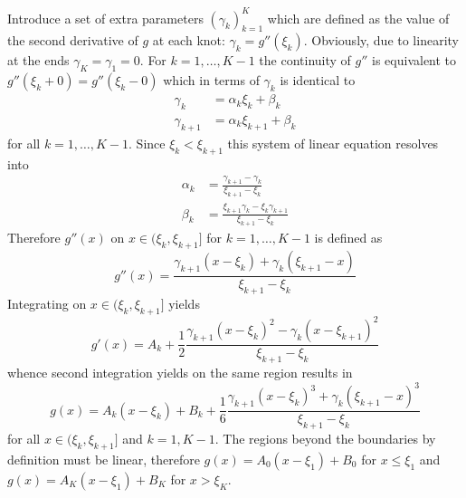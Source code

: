 \documentclass[a4paper]{article}
\begin{document}
Introduce a set of extra parameters $(\gamma_k)_{k=1}^K$ which are defined as the
value of the second derivative of $g$ at each knot: $\gamma_k=g''(\xi_k)$.
Obviously, due to linearity at the ends $\gamma_K = \gamma_1 = 0$.
For $k=1,\ldots, K-1$ the continuity of $g''$ is equivalent to $g''(\xi_k+0) = g''(\xi_k-0)$
which in terms of $\gamma_k$ is identical to
\begin{align*}
	\gamma_k &= \alpha_k \xi_k + \beta_k\\
	\gamma_{k+1} &= \alpha_k \xi_{k+1} + \beta_k
\end{align*}
for all $k=1,\ldots,K-1$. Since $\xi_k<\xi_{k+1}$ this system of linear equation
resolves into
\begin{align*}
	\alpha_k &= \frac{\gamma_{k+1}-\gamma_k}{\xi_{k+1}-\xi_k}\\
	\beta_k &= \frac{\xi_{k+1}\gamma_k - \xi_k\gamma_{k+1}}{\xi_{k+1}-\xi_k}
\end{align*}
Therefore $g''(x)$ on $x\in (\xi_k, \xi_{k+1}]$ for $k=1,\ldots, K-1$ is defined as
\[g''(x) = \frac{\gamma_{k+1}(x-\xi_k)+\gamma_k(\xi_{k+1}-x)}{\xi_{k+1}-\xi_k}\]
Integrating on $x\in (\xi_k,\xi_{k+1}]$ yields
\[g'(x) = A_k + \frac{1}{2}\frac{\gamma_{k+1}(x-\xi_k)^2-\gamma_k(x-\xi_{k+1})^2}{\xi_{k+1}-\xi_k}\]
whence second integration yields on the same region results in
\[
g(x)
= A_k(x - \xi_k) + B_k + \frac{1}{6}
	\frac{\gamma_{k+1}(x-\xi_k)^3+\gamma_k(\xi_{k+1}-x)^3}{\xi_{k+1}-\xi_k}
\]
for all $x\in (\xi_k,\xi_{k+1}]$ and $k=1, K-1$. The regions beyond the boundaries
by definition must be linear, therefore $g(x) = A_0 (x-\xi_1) + B_0$ for $x\leq \xi_1$
and $g(x) = A_K (x-\xi_1) + B_K$ for $x > \xi_K$.
\end{document}

